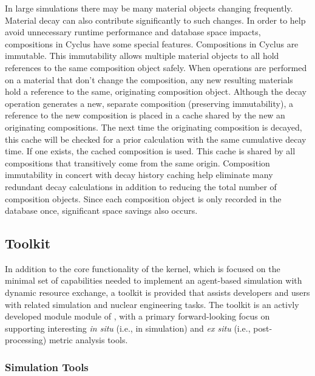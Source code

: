 In large simulations there may be many material objects changing frequently.
Material decay can also contribute significantly to such changes.  In order to
help avoid unnecessary runtime performance and database space impacts,
compositions in Cyclus have some special features.  Compositions in Cyclus are
immutable.  This immutability allows multiple material objects to all hold
references to the same composition object safely.  When operations are
performed on a material that don't change the composition, any new resulting
materials hold a reference to the same, originating composition object.
Although the decay operation generates a new, separate composition (preserving
immutability), a reference to the new composition is placed in a cache shared
by the new an originating compositions. The next time the originating
composition is decayed, this cache will be checked for a prior calculation
with the same cumulative decay time.  If one exists, the cached composition is
used.  This cache is shared by all compositions that transitively come from
the same origin.  Composition immutability in concert with decay history
caching help eliminate many redundant decay calculations in addition to
reducing the total number of composition objects.  Since each composition
object is only recorded in the database once, significant space savings also
occurs.

\subsection{Toolkit}

In addition to the core functionality of the \Cyclus kernel, which is focused on
the minimal set of capabilities needed to implement an agent-based simulation
with dynamic resource exchange, a toolkit is provided that assists developers
and users with related simulation and nuclear engineering tasks. The toolkit is
an activly developed module module of \Cyclus, with a primary forward-looking
focus on supporting interesting \textit{in situ} (i.e., in simulation) and
\textit{ex situ} (i.e., post-processing) metric analysis tools. 

\subsubsection{Simulation Tools}

